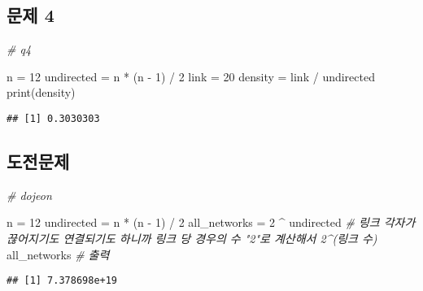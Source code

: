 \documentclass[
]{article}
\newenvironment{Shaded}{\begin{snugshade}}{\end{snugshade}}
\newcommand{\CommentTok}[1]{\textcolor[rgb]{0.56,0.35,0.01}{\textit{#1}}}
\newcommand{\DecValTok}[1]{\textcolor[rgb]{0.00,0.00,0.81}{#1}}
\newcommand{\FunctionTok}[1]{\textcolor[rgb]{0.00,0.00,0.00}{#1}}
\newcommand{\NormalTok}[1]{#1}
\newcommand{\OtherTok}[1]{\textcolor[rgb]{0.56,0.35,0.01}{#1}}
\newcommand{\SpecialCharTok}[1]{\textcolor[rgb]{0.00,0.00,0.00}{#1}}
\begin{document}
\hypertarget{uxbb38uxc81c-4}{%
\subsection{문제 4}\label{uxbb38uxc81c-4}}

\begin{Shaded}
\begin{Highlighting}[]
\CommentTok{\# q4}

\NormalTok{n }\OtherTok{=} \DecValTok{12}
\NormalTok{undirected }\OtherTok{=}\NormalTok{ n }\SpecialCharTok{*}\NormalTok{ (n }\SpecialCharTok{{-}} \DecValTok{1}\NormalTok{) }\SpecialCharTok{/} \DecValTok{2}
\NormalTok{link }\OtherTok{=} \DecValTok{20}
\NormalTok{density }\OtherTok{=}\NormalTok{ link }\SpecialCharTok{/}\NormalTok{ undirected}
\FunctionTok{print}\NormalTok{(density)}
\end{Highlighting}
\end{Shaded}

\begin{verbatim}
## [1] 0.3030303
\end{verbatim}

\hypertarget{uxb3c4uxc804uxbb38uxc81c}{%
\subsection{도전문제}\label{uxb3c4uxc804uxbb38uxc81c}}

\begin{Shaded}
\begin{Highlighting}[]
\CommentTok{\# dojeon}

\NormalTok{n }\OtherTok{=} \DecValTok{12}
\NormalTok{undirected }\OtherTok{=}\NormalTok{ n }\SpecialCharTok{*}\NormalTok{ (n }\SpecialCharTok{{-}} \DecValTok{1}\NormalTok{) }\SpecialCharTok{/} \DecValTok{2}
\NormalTok{all\_networks }\OtherTok{=} \DecValTok{2} \SpecialCharTok{\^{}}\NormalTok{ undirected }\CommentTok{\# 링크 각자가 끊어지기도 연결되기도 하니까 링크 당 경우의 수 "2"로 계산해서 2\^{}(링크 수)}
\NormalTok{all\_networks }\CommentTok{\# 출력}
\end{Highlighting}
\end{Shaded}

\begin{verbatim}
## [1] 7.378698e+19
\end{verbatim}
\end{document}

